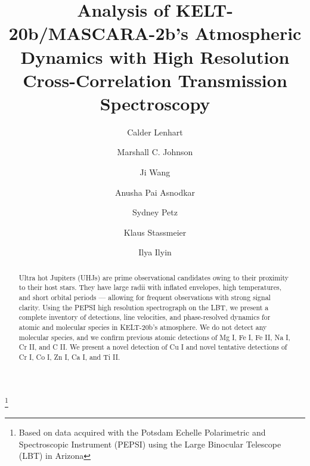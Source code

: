 \documentclass[twocolumn]{aastex631}
\begin{document}
    \title{Analysis of KELT-20b/MASCARA-2b's Atmospheric Dynamics with High Resolution Cross-Correlation Transmission Spectroscopy}\footnote{Based on data acquired with the Potsdam Echelle Polarimetric and Spectroscopic Instrument (PEPSI) using the Large Binocular Telescope (LBT) in Arizona}

    \author[0009-0001-1459-3738]{Calder Lenhart}

    \author[0000-0002-5099-8185]{Marshall C. Johnson}

    \author{Ji Wang}

    \author[0000-0002-8823-8237]{Anusha Pai Asnodkar}

    \author{Sydney Petz}

    \author[0000-0002-6192-6494]{Klaus Stassmeier}

    \author[0000-0002-0551-046X]{Ilya Ilyin}


    \begin{abstract}
        Ultra hot Jupiters (UHJs) are prime observational candidates owing to their proximity to their host stars. They have large radii with inflated envelopes, high temperatures, and short orbital periods --- allowing for frequent observations with strong signal clarity. Using the PEPSI high resolution spectrograph on the LBT, we present a complete inventory of detections, line velocities, and phase-resolved dynamics for atomic and molecular species in KELT-20b's atmosphere. We do not detect any molecular species, and we confirm previous atomic detections of Mg I, Fe I, Fe II, Na I, Cr II, and C II. We present a novel detection of Cu I and novel tentative detections of Cr I, Co I, Zn I, Ca I, and Ti II.
    \end{abstract}
\end{document}
